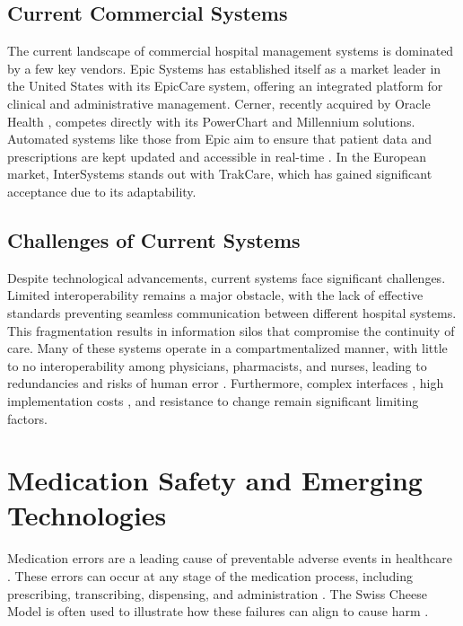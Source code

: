 \subsection{Current Commercial Systems}

The current landscape of commercial hospital management systems is dominated by a few key vendors. Epic Systems \cite{hertzum2022} has established itself as a market leader in the United States with its EpicCare system, offering an integrated platform for clinical and administrative management. Cerner, recently acquired by Oracle Health \cite{lin2018}, competes directly with its PowerChart and Millennium solutions. Automated systems like those from Epic aim to ensure that patient data and prescriptions are kept updated and accessible in real-time \cite{keller2023using}. In the European market, InterSystems stands out with TrakCare, which has gained significant acceptance due to its adaptability.

\subsection{Challenges of Current Systems}

Despite technological advancements, current systems face significant challenges. Limited interoperability \cite{keasberry2017} remains a major obstacle, with the lack of effective standards preventing seamless communication between different hospital systems. This fragmentation results in information silos that compromise the continuity of care. Many of these systems operate in a compartmentalized manner, with little to no interoperability among physicians, pharmacists, and nurses, leading to redundancies and risks of human error \cite{Kallio2021}. Furthermore, complex interfaces \cite{mcgreevey2020}, high implementation costs \cite{adler2021}, and resistance to change \cite{holden2011, venkatesh2003} remain significant limiting factors.

\section{Medication Safety and Emerging Technologies}

Medication errors are a leading cause of preventable adverse events in healthcare \cite{ciapponi2021, mulac2020}. These errors can occur at any stage of the medication process, including prescribing, transcribing, dispensing, and administration \cite{isaacs2021, manias2021, kallio2020, boytim2018}. The Swiss Cheese Model is often used to illustrate how these failures can align to cause harm \citep{ciapponi2021, mulac2020}.

